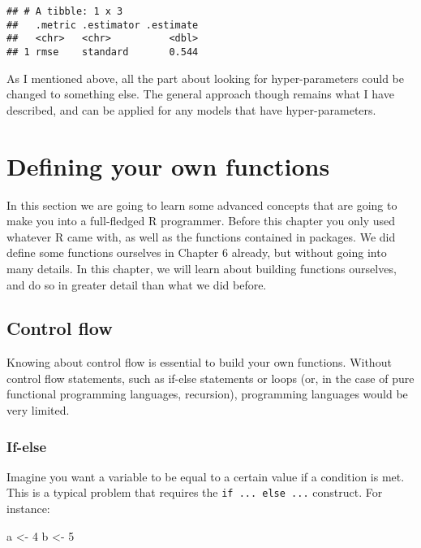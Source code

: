 \documentclass[
]{article}
\newenvironment{Shaded}{\begin{snugshade}}{\end{snugshade}}
\newcommand{\DecValTok}[1]{\textcolor[rgb]{0.00,0.00,0.81}{#1}}
\newcommand{\NormalTok}[1]{#1}
\newcommand{\StringTok}[1]{\textcolor[rgb]{0.31,0.60,0.02}{#1}}
\begin{document}
\begin{verbatim}
## # A tibble: 1 x 3
##   .metric .estimator .estimate
##   <chr>   <chr>          <dbl>
## 1 rmse    standard       0.544
\end{verbatim}

As I mentioned above, all the part about looking for hyper-parameters could be changed to something
else. The general approach though remains what I have described, and can be applied for any models
that have hyper-parameters.

\hypertarget{defining-your-own-functions}{%
\section{Defining your own functions}\label{defining-your-own-functions}}

In this section we are going to learn some advanced concepts that are going to make you into a
full-fledged R programmer. Before this chapter you only used whatever R came with, as well as the
functions contained in packages. We did define some functions ourselves in Chapter 6 already, but
without going into many details. In this chapter, we will learn about building functions ourselves,
and do so in greater detail than what we did before.

\hypertarget{control-flow}{%
\subsection{Control flow}\label{control-flow}}

Knowing about control flow is essential to build your own functions. Without control flow statements,
such as if-else statements or loops (or, in the case of pure functional programming languages, recursion),
programming languages would be very limited.

\hypertarget{if-else}{%
\subsubsection{If-else}\label{if-else}}

Imagine you want a variable to be equal to a certain value if a condition is met. This is a typical
problem that requires the \texttt{if\ ...\ else\ ...} construct. For instance:

\begin{Shaded}
\begin{Highlighting}[]
\NormalTok{a \textless{}{-}}\StringTok{ }\DecValTok{4}
\NormalTok{b \textless{}{-}}\StringTok{ }\DecValTok{5}
\end{Highlighting}
\end{Shaded}
\end{document}
